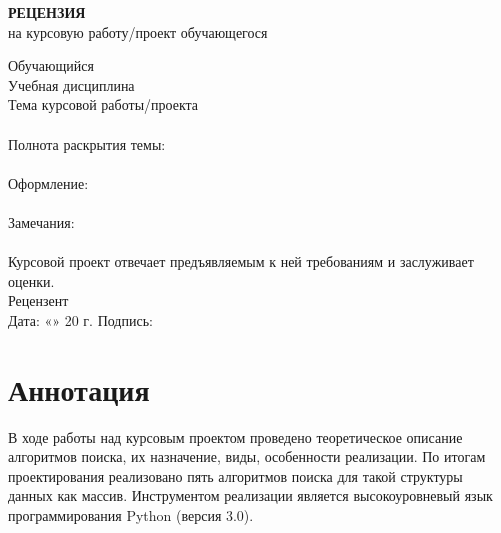\documentclass[a4paper,14pt]{extarticle}
\begin{document}
\newpage
\begin{center}
\textbf{РЕЦЕНЗИЯ}\\
на курсовую работу/проект обучающегося
\end{center}
\vspace{0.5cm}
\noindent Обучающийся \underline{\hspace{12.5cm}}\\[0.3cm]
Учебная дисциплина \underline{\hspace{11.3cm}}\\[0.3cm]
Тема курсовой работы/проекта \underline{\hspace{9.5cm}}\\
\underline{\hspace{16.5cm}}\\[0.3cm]
Полнота раскрытия темы: \underline{\hspace{11cm}}\\
\underline{\hspace{16.5cm}}\\[0.3cm]
Оформление: \underline{\hspace{13.4cm}}\\
\underline{\hspace{16.5cm}}\\[0.3cm]
Замечания: \underline{\hspace{13.8cm}}\\
\underline{\hspace{16.5cm}}\\[0.5cm]
Курсовой проект отвечает предъявляемым к ней требованиям и заслуживает \underline{\hspace{4cm}} оценки.\\[0.8cm]
Рецензент \underline{\hspace{8cm}}\\[0.8cm]
Дата: «\underline{\hspace{1cm}}» \underline{\hspace{3cm}} 20\underline{\hspace{0.5cm}} г. \hfill Подпись: \underline{\hspace{3cm}}

\newpage
\section*{Аннотация}
В ходе работы над курсовым проектом проведено теоретическое описание алгоритмов поиска, их назначение, виды, особенности реализации. По итогам проектирования реализовано пять алгоритмов поиска для такой структуры данных как массив. Инструментом реализации является высокоуровневый язык программирования Python (версия 3.0).
\end{document}
